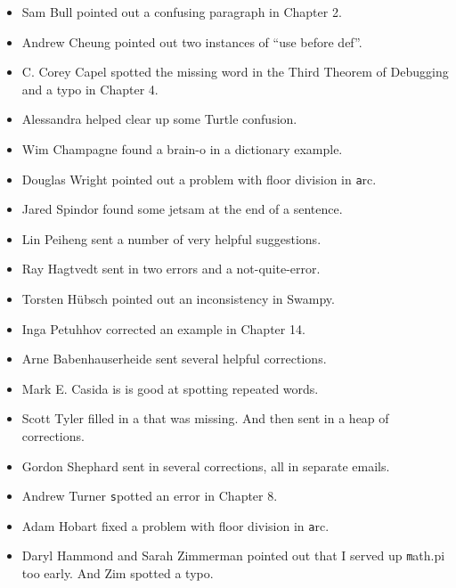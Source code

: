 \documentclass[
DIV=11,
fontsize=13,
twoside,
headinclude=false,
titlepage=firstiscover,
abstract=true,
headsepline=true,
footsepline=true,
chapterprefix=true, %
headings=big,
bibliography=totoc,%
captions=tableheading
]{scrbook}
\theoremstyle{definition}
\begin{document}
\begin{itemize}
\item Sam Bull pointed out a confusing paragraph in Chapter 2.

\item Andrew Cheung pointed out two instances of ``use before def''.

\item C. Corey Capel spotted the missing word in the Third Theorem
of Debugging and a typo in Chapter 4.

\item Alessandra helped clear up some Turtle confusion.

\item Wim Champagne found a brain-o in a dictionary example.

\item Douglas Wright pointed out a problem with floor division in
{\texttt arc}.

\item Jared Spindor found some jetsam at the end of a sentence.

\item Lin Peiheng sent a number of very helpful suggestions.

\item Ray Hagtvedt sent in two errors and a not-quite-error.

\item Torsten H\"{u}bsch pointed out an inconsistency in Swampy.

\item Inga Petuhhov corrected an example in Chapter 14.

\item Arne Babenhauserheide sent several helpful corrections.

\item Mark E. Casida is is good at spotting repeated words.

\item Scott Tyler filled in a that was missing.  And then sent in
a heap of corrections.

\item Gordon Shephard sent in several corrections, all in separate
emails.

\item Andrew Turner {\texttt spot}ted an error in Chapter 8.

\item Adam Hobart fixed a problem with floor division in {\texttt arc}.

\item Daryl Hammond and Sarah Zimmerman pointed out that I served
up {\texttt math.pi} too early.  And Zim spotted a typo.


\end{itemize}
\end{document}
